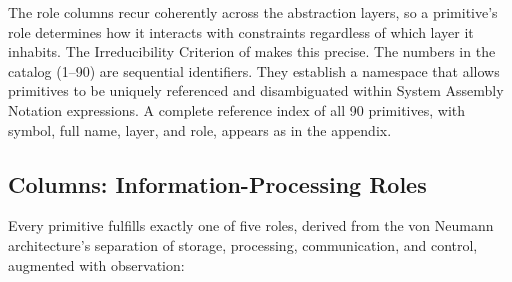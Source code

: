 \documentclass[10pt,twocolumn]{article}
\begin{document}
The role columns recur coherently across the abstraction layers, so a primitive's role determines how it interacts with constraints regardless of which layer it inhabits. The Irreducibility Criterion of  makes this precise. The numbers in the catalog (1--90) are sequential identifiers. They establish a namespace that allows primitives to be uniquely referenced and disambiguated within System Assembly Notation expressions. A complete reference index of all 90 primitives, with symbol, full name, layer, and role, appears as  in the appendix.

\subsection{Columns: Information-Processing Roles}

Every primitive fulfills exactly one of five roles, derived from the von Neumann architecture's separation of storage, processing, communication, and control, augmented with observation:
\end{document}
